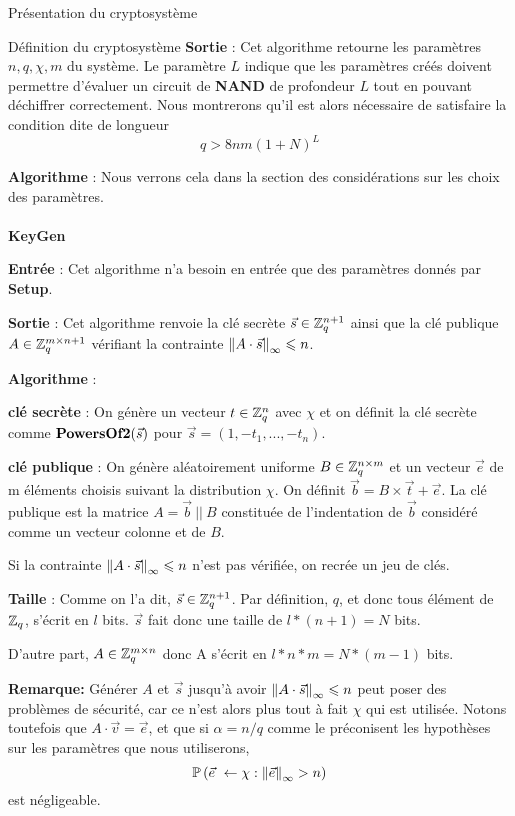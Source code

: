 \begin{section}{Présentation du cryptosystème}
\begin{subsection}{Définition du cryptosystème}
	\textbf{Sortie} : Cet algorithme retourne les paramètres $n, q, \chi, m$ du système. Le paramètre $L$ indique que les paramètres créés doivent permettre d'évaluer un circuit de \textbf{NAND} de profondeur $L$ tout en pouvant déchiffrer correctement. Nous montrerons qu'il est alors nécessaire de satisfaire la condition dite \og de longueur \fg  
	\[q > 8nm (1 + N)^L \]

	\textbf{Algorithme} : Nous verrons cela dans la section des considérations sur les choix des paramètres.
	
	\paragraph{}
	\textbf{KeyGen}
	\flushleft
	
	\textbf{Entrée} : Cet algorithme n'a besoin en entrée que des paramètres donnés par \textbf{Setup}.

	\textbf{Sortie} : Cet algorithme renvoie la clé secrète $\vec{s} \in
	\mathbb{Z}_q^{n+1}$ ainsi que la clé publique $A \in \mathbb{Z}_q^{m \times n+1}$ vérifiant la contrainte 
	${\|A \cdot \vec{s}\|}_{\infty} \leqslant n$.

	\textbf{Algorithme} :

	\textbf{clé secrète} : On génère un vecteur $t \in \mathbb{Z}_q^n$ avec $\chi$ et on définit la clé secrète comme $\text{\textbf{PowersOf2}}(\vec{s})$ pour $\vec{s} = (1, -t_1, ..., -t_n)$.

	\textbf{clé publique} : On génère aléatoirement uniforme $B \in \mathbb{Z}_q^{n \times m}$ et un vecteur $\vec{e}$ de m
	éléments choisis suivant la distribution $\chi$. On définit $\vec{b} = B \times \vec{t} + \vec{e}$.  La clé
	publique est la matrice $A = \vec{b}\: || \:B$ constituée de l'indentation de $\vec{b}$ considéré comme un
	vecteur colonne et de $B$.

	Si la contrainte ${\|A \cdot \vec{s}\|}_{\infty} \leqslant n$ n'est pas vérifiée, on recrée un jeu de clés.

	\textbf{Taille} : Comme on l'a dit, $\vec{s} \in \mathbb{Z}_q^{n+1}$. Par définition, $q$, et donc tous élément de $\mathbb{Z}_q$, s'écrit en $l$ bits. $\vec{s}$ fait donc une taille de $l * (n+1) = N$ bits.

	D'autre part, $A \in \mathbb{Z}_q^{m \times n}$ donc A s'écrit en $l * n * m =	N * (m - 1)$ bits.

	\textbf{Remarque:} Générer $A$ et $\vec{s}$ jusqu'à avoir ${\|A \cdot \vec{s}\|}_{\infty} \leqslant n$ peut poser des problèmes de sécurité, car ce n'est alors plus tout à fait $\chi$ qui est utilisée. Notons toutefois que $A \cdot \vec{v} = \vec{e}$, et que si $\alpha = n/q$ comme le préconisent les hypothèses sur les paramètres que nous utiliserons,
	\[ \PP\left(\vec{e} \leftarrow \chi: \norm{\vec{e}} > n\right) \]
	est négligeable.

\end{subsection}
\end{section}
